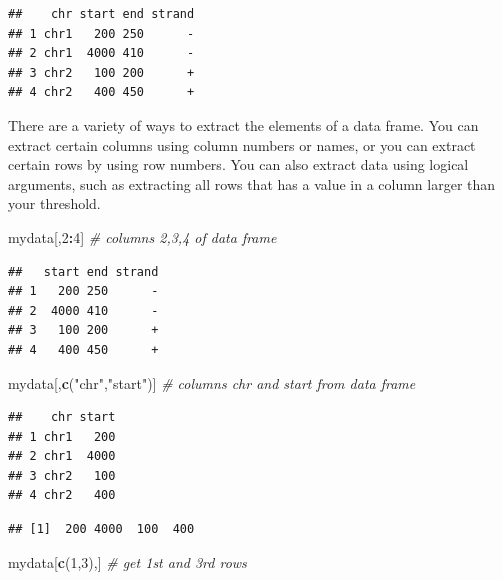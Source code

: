 \documentclass[12pt,]{krantz}
\newenvironment{Shaded}{\begin{snugshade}}{\end{snugshade}}
\newcommand{\CommentTok}[1]{\textcolor[rgb]{0.56,0.35,0.01}{\textit{#1}}}
\newcommand{\DecValTok}[1]{\textcolor[rgb]{0.00,0.00,0.81}{#1}}
\newcommand{\KeywordTok}[1]{\textcolor[rgb]{0.13,0.29,0.53}{\textbf{#1}}}
\newcommand{\NormalTok}[1]{#1}
\newcommand{\OperatorTok}[1]{\textcolor[rgb]{0.81,0.36,0.00}{\textbf{#1}}}
\newcommand{\StringTok}[1]{\textcolor[rgb]{0.31,0.60,0.02}{#1}}
\theoremstyle{definition}
\theoremstyle{definition}
\theoremstyle{definition}
\theoremstyle{remark}
\begin{document}
\begin{verbatim}
##    chr start end strand
## 1 chr1   200 250      -
## 2 chr1  4000 410      -
## 3 chr2   100 200      +
## 4 chr2   400 450      +
\end{verbatim}

There are a variety of ways to extract the elements of a data frame. You
can extract certain columns using column numbers or names, or you can
extract certain rows by using row numbers. You can also extract data
using logical arguments, such as extracting all rows that has a value in
a column larger than your threshold.

\begin{Shaded}
\begin{Highlighting}[]
\NormalTok{mydata[,}\DecValTok{2}\OperatorTok{:}\DecValTok{4}\NormalTok{] }\CommentTok{# columns 2,3,4 of data frame}
\end{Highlighting}
\end{Shaded}

\begin{verbatim}
##   start end strand
## 1   200 250      -
## 2  4000 410      -
## 3   100 200      +
## 4   400 450      +
\end{verbatim}

\begin{Shaded}
\begin{Highlighting}[]
\NormalTok{mydata[,}\KeywordTok{c}\NormalTok{(}\StringTok{"chr"}\NormalTok{,}\StringTok{"start"}\NormalTok{)] }\CommentTok{# columns chr and start from data frame}
\end{Highlighting}
\end{Shaded}

\begin{verbatim}
##    chr start
## 1 chr1   200
## 2 chr1  4000
## 3 chr2   100
## 4 chr2   400
\end{verbatim}

\begin{Shaded}
\end{Shaded}

\begin{verbatim}
## [1]  200 4000  100  400
\end{verbatim}

\begin{Shaded}
\begin{Highlighting}[]
\NormalTok{mydata[}\KeywordTok{c}\NormalTok{(}\DecValTok{1}\NormalTok{,}\DecValTok{3}\NormalTok{),] }\CommentTok{# get 1st and 3rd rows}
\end{Highlighting}
\end{Shaded}
\end{document}
